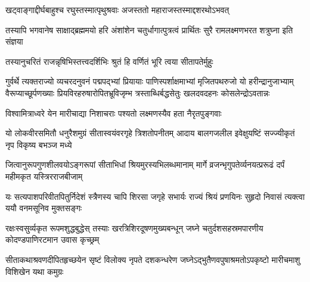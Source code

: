 

\translink{}

\storymeta



\twolineshloka
{खट्वाङ्गाद्दीर्घबाहुश्च रघुस्तस्मात्पृथुश्रवाः}
{अजस्ततो महाराजस्तस्माद्दशरथोऽभवत्} %

\threelineshloka
{तस्यापि भगवानेष साक्षाद्ब्रह्ममयो हरि}
{अंशांशेन चतुर्धागात्पुत्रत्वं प्रार्थितः सुरै}
{रामलक्ष्मणभरत शत्रुघ्ना इति संज्ञया} %

\twolineshloka
{तस्यानुचरितं राजन्नृषिभिस्तत्त्वदर्शिभिः}
{श्रुतं हि वर्णितं भूरि त्वया सीतापतेर्मुहुः} %

\fourlineindentedshloka
{गुर्वर्थे त्यक्तराज्यो व्यचरदनुवनं पद्मपद्भ्यां प्रियायाः}
{पाणिस्पर्शाक्षमाभ्यां मृजितपथरुजो यो हरीन्द्रानुजाभ्याम्}
{वैरूप्याच्छूर्पणख्याः प्रियविरहरुषारोपितभ्रूविजृम्भ}
{त्रस्ताब्धिर्बद्धसेतुः खलदवदहनः कोसलेन्द्रोऽवतान्नः} %

\twolineshloka
{विश्वामित्राध्वरे येन मारीचाद्या निशाचराः}
{पश्यतो लक्ष्मणस्यैव हता नैरृतपुङ्गवाः} %

\fourlineindentedshloka
{यो लोकवीरसमितौ धनुरैशमुग्रं}
{सीतास्वयंवरगृहे त्रिशतोपनीतम्}
{आदाय बालगजलील इवेक्षुयष्टिं}
{सज्ज्यीकृतं नृप विकृष्य बभञ्ज मध्ये} %

\fourlineindentedshloka
{जित्वानुरूपगुणशीलवयोऽङ्गरूपां}
{सीताभिधां श्रियमुरस्यभिलब्धमानाम्}
{मार्गे व्रजन्भृगुपतेर्व्यनयत्प्ररूढं}
{दर्पं महीमकृत यस्त्रिरराजबीजाम्} %

\fourlineindentedshloka
{यः सत्यपाशपरिवीतपितुर्निदेशं}
{स्त्रैणस्य चापि शिरसा जगृहे सभार्यः}
{राज्यं श्रियं प्रणयिनः सुहृदो निवासं}
{त्यक्त्वा ययौ वनमसूनिव मुक्तसङ्गः} %

\fourlineindentedshloka
{रक्षःस्वसुर्व्यकृत रूपमशुद्धबुद्धेस्}
{तस्याः खरत्रिशिरदूषणमुख्यबन्धून्}
{जघ्ने चतुर्दशसहस्रमपारणीय}
{कोदण्डपाणिरटमान उवास कृच्छ्रम्} %

\fourlineindentedshloka
{सीताकथाश्रवणदीपितहृच्छयेन}
{सृष्टं विलोक्य नृपते दशकन्धरेण}
{जघ्नेऽद्भुतैणवपुषाश्रमतोऽपकृष्टो}
{मारीचमाशु विशिखेन यथा कमुग्रः} %

